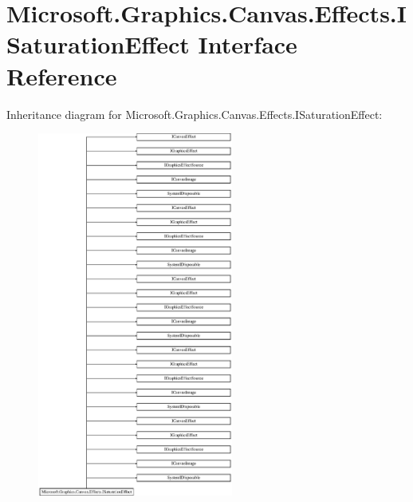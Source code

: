 \hypertarget{interface_microsoft_1_1_graphics_1_1_canvas_1_1_effects_1_1_i_saturation_effect}{}\section{Microsoft.\+Graphics.\+Canvas.\+Effects.\+I\+Saturation\+Effect Interface Reference}
\label{interface_microsoft_1_1_graphics_1_1_canvas_1_1_effects_1_1_i_saturation_effect}
Inheritance diagram for Microsoft.\+Graphics.\+Canvas.\+Effects.\+I\+Saturation\+Effect\+:\begin{figure}[H]
\begin{center}
\leavevmode
\includegraphics[height=12.000000cm]{interface_microsoft_1_1_graphics_1_1_canvas_1_1_effects_1_1_i_saturation_effect}
\end{center}
\end{figure}
